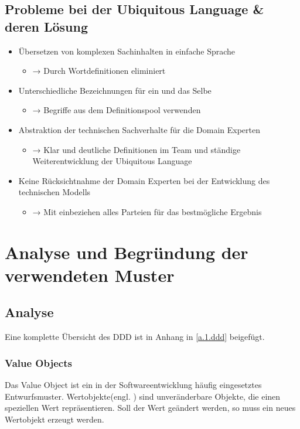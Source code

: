 		\subsection{Probleme bei der Ubiquitous Language \& deren Lösung \cite{ubiquitousLanguage.medium}}
		\begin{itemize}
			\item Übersetzen von komplexen Sachinhalten in einfache Sprache
			\begin{itemize}
				\item[] → Durch Wortdefinitionen eliminiert
			\end{itemize}
			\item Unterschiedliche Bezeichnungen für ein und das Selbe
			\begin{itemize}
				\item[] → Begriffe aus dem Definitionspool verwenden
			\end{itemize}
			\item Abstraktion der technischen Sachverhalte für die Domain Experten
			\begin{itemize}
				\item[] → Klar und deutliche Definitionen im Team und ständige Weiterentwicklung der Ubiquitous Language
			\end{itemize}
			\item Keine Rücksichtnahme der Domain Experten bei der Entwicklung des technischen Modells
			\begin{itemize}
				\item[] → Mit einbeziehen alles Parteien für das bestmögliche Ergebnis
			\end{itemize}
		\end{itemize}
	
	\section{Analyse und Begründung der verwendeten Muster}
		
		\subsection{Analyse}
		Eine komplette Übersicht des \acl{DDD} ist in Anhang in \cref{a.1.ddd} beigefügt.
			
			\subsubsection{Value Objects \cite{valueObjects.medium}}
			Das Value Object ist ein in der Softwareentwicklung häufig eingesetztes Entwurfsmuster. Wertobjekte(engl. ) sind unveränderbare Objekte, die einen speziellen Wert repräsentieren. Soll der Wert geändert werden, so muss ein neues Wertobjekt erzeugt werden.
			
